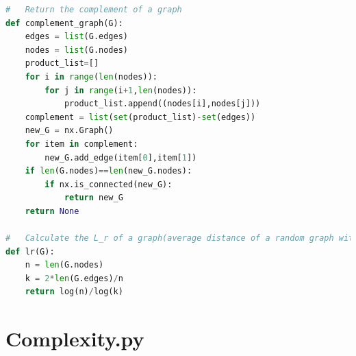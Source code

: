 \documentclass[12pt]{article}
\begin{document}
\begin{lstlisting}[language=Python,breaklines=true]
#   Return the complement of a graph
def complement_graph(G):
    edges = list(G.edges)
    nodes = list(G.nodes)
    product_list=[]
    for i in range(len(nodes)):
        for j in range(i+1,len(nodes)):
            product_list.append((nodes[i],nodes[j]))
    complement = list(set(product_list)-set(edges))
    new_G = nx.Graph()
    for item in complement:
        new_G.add_edge(item[0],item[1])
    if len(G.nodes)==len(new_G.nodes):
        if nx.is_connected(new_G):
            return new_G
    return None

#   Calculate the L_r of a graph(average distance of a random graph with given m and n)
def lr(G):
    n = len(G.nodes)
    k = 2*len(G.edges)/n
    return log(n)/log(k)
\end{lstlisting}

\section{Complexity.py}
\label{complexity_code}
\end{document}
